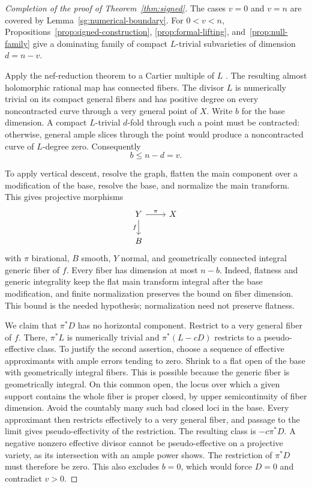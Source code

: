 \begin{proof}[Completion of the proof of Theorem~\ref{thm:signed}]
The cases $v=0$ and $v=n$ are covered by
Lemma~\ref{sg:numerical-boundary}.  For $0<v<n$,
Propositions~\ref{prop:signed-construction},
\ref{prop:formal-lifting}, and~\ref{prop:null-family}
give a dominating family of compact $L$-trivial
subvarieties of dimension $d=n-v$.

Apply the nef-reduction theorem to a Cartier multiple of
$L$ \cite[Theorem~2.1]{BauerEtAl2002}.  The resulting almost
holomorphic rational map has connected fibers.  The
divisor $L$ is numerically trivial on its compact general
fibers and has positive degree on every noncontracted
curve through a very general point of $X$.  Write $b$
for the base dimension.  A compact $L$-trivial $d$-fold
through such a point must be contracted: otherwise,
general ample slices through the point would produce a
noncontracted curve of $L$-degree zero.  Consequently
\[
 b\le n-d=v.
\]

To apply vertical descent, resolve the graph, flatten
the main component over a modification of the base,
resolve the base, and normalize the main transform.
This gives projective morphisms
\[
 \begin{tikzcd}
 Y \arrow[r,"\pi"] \arrow[d,"f"'] & X\\
 B &
 \end{tikzcd}
\]
with $\pi$ birational, $B$ smooth, $Y$ normal, and
geometrically connected integral generic fiber of $f$.
Every fiber has dimension at most $n-b$.  Indeed,
flatness and generic integrality keep the flat main
transform integral after the base modification, and
finite normalization preserves the bound on fiber
dimension.  This bound is the needed hypothesis;
normalization need not preserve flatness.

We claim that $\pi^*D$ has no horizontal component.
Restrict to a very general fiber of $f$.  There,
$\pi^*L$ is numerically trivial and $\pi^*(L-cD)$
restricts to a pseudo-effective class.  To justify the
second assertion, choose a sequence of effective approximants with
ample errors tending to zero. Shrink to a flat open of the base with
geometrically integral fibers. This is possible because the generic
fiber is geometrically integral. On this common open,
the locus over which a given support contains the whole fiber is
proper closed, by upper semicontinuity of fiber dimension.
Avoid the countably many such bad closed loci in the base.
Every approximant then restricts effectively to a very general fiber,
and passage to the limit gives pseudo-effectivity of the restriction.
The resulting class is $-c\pi^*D$.
A negative nonzero effective divisor cannot be
pseudo-effective on a projective variety, as its
intersection with an ample power shows.  The restriction
of $\pi^*D$ must therefore be zero.  This also excludes
$b=0$, which would force $D=0$ and contradict $v>0$.


\end{proof}
